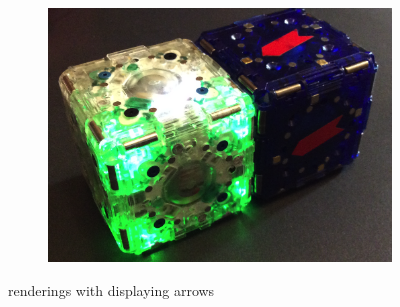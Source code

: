 \begin{figure}[t]
\begin{subfigure}[b]{1.5 in}
		
		\includegraphics[width=.9\linewidth]{Figures/mTagsCover.png}
		
	\end{subfigure}


	\caption{\tagNamePlural renderings with displaying arrows}

	\label{fig:PlaneChanging2}
\end{figure}

%
%	
%
%
%
%
%
%
